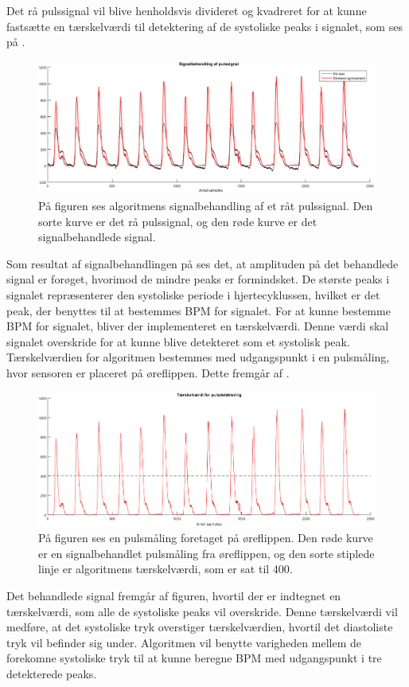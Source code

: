 Det rå pulssignal vil blive henholdsvis divideret og kvadreret for at kunne fastsætte en tærskelværdi til detektering af de systoliske peaks i signalet, som ses på . 
\begin{figure}[H]
	\centering
	\includegraphics[scale=0.4]{figures/cDesign/puls_ore_behandlet.png}
	\caption{På figuren ses algoritmens signalbehandling af et råt pulssignal. Den sorte kurve er det rå pulssignal, og den røde kurve er det signalbehandlede signal.}
	\label{fig:behandlet_puls}
\end{figure}
Som resultat af signalbehandlingen på  ses det, at amplituden på det behandlede signal er forøget, hvorimod de mindre peaks er formindsket. De største peaks i signalet repræsenterer den systoliske periode i hjertecyklussen, hvilket er det peak, der benyttes til at bestemmes BPM for signalet. For at kunne bestemme BPM for signalet, bliver der implementeret en tærskelværdi. Denne værdi skal signalet overskride for at kunne blive detekteret som et systolisk peak. Tærskelværdien for algoritmen bestemmes med udgangspunkt i en pulsmåling, hvor sensoren er placeret på øreflippen. Dette fremgår af .
\begin{figure}[H]
	\centering
	\includegraphics[scale=0.4]{figures/cDesign/puls_taerskel.png}
	\caption{På figuren ses en pulsmåling foretaget på øreflippen. Den røde kurve er en signalbehandlet pulsmåling fra øreflippen, og den sorte stiplede linje er algoritmens tærskelværdi, som er sat til 400.}
	\label{fig:taerskel_puls}
\end{figure} \vspace{-0.5cm}
Det behandlede signal fremgår af figuren, hvortil der er indtegnet en tærskelværdi, som alle de systoliske peaks vil overskride. Denne tærskelværdi vil medføre, at det systoliske tryk overstiger tærskelværdien, hvortil det diastoliste tryk vil befinder sig under. Algoritmen vil benytte varigheden mellem de forekomne systoliske tryk til at kunne beregne BPM med udgangspunkt i tre detekterede peaks. 

